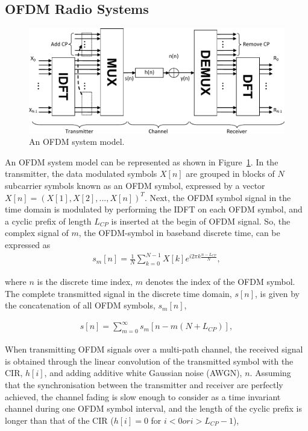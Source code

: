 \subsection{OFDM Radio Systems}
\begin{figure}
	\centerline{\includegraphics [width=0.8\columnwidth] {Figures/OFDM-model.pdf} }
	\caption{An OFDM system model.}
	\label{fig:OFDM-model}
\end{figure}
An OFDM system model can be represented as shown in Figure~\ref{fig:OFDM-model}.
In the transmitter, the data modulated symbols $X[n]$ are grouped in blocks of $N$ subcarrier symbols known as an OFDM symbol, expressed by a vector $X[n]=(X[1], X[2], ..., X[n])^T$.
Next, the OFDM symbol signal in the time domain is modulated by performing the IDFT on each OFDM symbol, and a cyclic prefix of length $L_{CP}$ is inserted at the begin of OFDM signal.
So, the complex signal of $m$, the OFDM-symbol in baseband discrete time, can be expressed as
\begin{eqnarray}
\label{equ:OFDMsymbol}
s_{m}[n] = \frac{1}{N} \sum_{k=0}^{N-1}X[k]e^{i2\pi k\frac{n-L_{CP}}{N}},
\end{eqnarray}

where $n$ is the discrete time index, $m$ denotes the index of the OFDM symbol.
The complete transmitted signal in the discrete time domain, $s[n]$, is given by the concatenation of all OFDM symbols, $s_{m}[n]$,

\begin{eqnarray}
\label{equ:OFDMsignal}
s[n] =  \sum_{m=0}^{\infty} s_{m}[n-m(N+L_{CP})],
\end{eqnarray}

When transmitting OFDM signals over a multi-path channel, the received signal is obtained through the linear convolution of the transmitted symbol with the CIR, $h[i]$, and adding additive white Gaussian noise (AWGN), $n$.
Assuming that the synchronisation between the transmitter and receiver are perfectly achieved, the channel fading is slow enough to consider as a time invariant channel during one OFDM symbol interval, and the length of the cyclic prefix is longer than that of the CIR ($h[i] = 0$ for $i < 0 or i > L_{CP}-1$),


